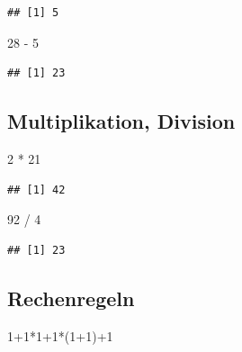 \documentclass[
]{book}
\newenvironment{Shaded}{\begin{snugshade}}{\end{snugshade}}
\newcommand{\DecValTok}[1]{\textcolor[rgb]{0.00,0.00,0.81}{#1}}
\newcommand{\NormalTok}[1]{#1}
\newcommand{\SpecialCharTok}[1]{\textcolor[rgb]{0.00,0.00,0.00}{#1}}
\begin{document}
\begin{verbatim}
## [1] 5
\end{verbatim}

\begin{Shaded}
\begin{Highlighting}[]
\DecValTok{28} \SpecialCharTok{{-}} \DecValTok{5}  
\end{Highlighting}
\end{Shaded}

\begin{verbatim}
## [1] 23
\end{verbatim}

\hypertarget{multiplikation-division}{%
\subsection*{Multiplikation, Division}\label{multiplikation-division}}

\begin{Shaded}
\begin{Highlighting}[]
\DecValTok{2} \SpecialCharTok{*} \DecValTok{21}   
\end{Highlighting}
\end{Shaded}

\begin{verbatim}
## [1] 42
\end{verbatim}

\begin{Shaded}
\begin{Highlighting}[]
\DecValTok{92} \SpecialCharTok{/} \DecValTok{4}
\end{Highlighting}
\end{Shaded}

\begin{verbatim}
## [1] 23
\end{verbatim}

\hypertarget{rechenregeln}{%
\subsection*{Rechenregeln}\label{rechenregeln}}

\begin{Shaded}
\begin{Highlighting}[]
\DecValTok{1}\SpecialCharTok{+}\DecValTok{1}\SpecialCharTok{*}\DecValTok{1}\SpecialCharTok{+}\DecValTok{1}\SpecialCharTok{*}\NormalTok{(}\DecValTok{1}\SpecialCharTok{+}\DecValTok{1}\NormalTok{)}\SpecialCharTok{+}\DecValTok{1}
\end{Highlighting}
\end{Shaded}
\end{document}
